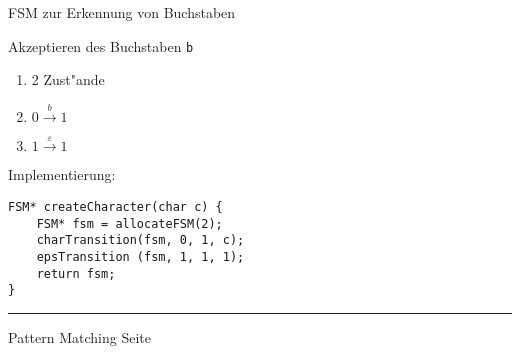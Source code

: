
\begin{slide}{}
\normalsize

\begin{center}
FSM zur Erkennung von Buchstaben
\end{center}
\vspace*{0.5cm}

\footnotesize
Akzeptieren des Buchstaben \texttt{b} \\[1.3cm]
\hspace*{1.3cm} 

\begin{enumerate}
\item 2 Zust"ande
\item $0 \stackrel{b}{\rightarrow} 1$
\item $1 \stackrel{\varepsilon}{\rightarrow} 1$
\end{enumerate}

Implementierung:
\begin{verbatim}
FSM* createCharacter(char c) {
    FSM* fsm = allocateFSM(2);
    charTransition(fsm, 0, 1, c);
    epsTransition (fsm, 1, 1, 1);
    return fsm;
}
\end{verbatim}

\vspace*{\fill}
\tiny \addtocounter{mypage}{1}
\rule{17cm}{1mm}
Pattern Matching \hspace*{\fill} Seite 
\end{slide}


